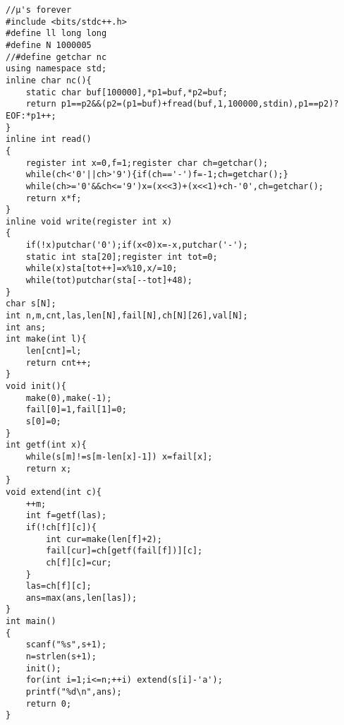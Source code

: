 \begin{verbatim}
//μ's forever
#include <bits/stdc++.h>
#define ll long long 
#define N 1000005
//#define getchar nc
using namespace std;
inline char nc(){
    static char buf[100000],*p1=buf,*p2=buf;
    return p1==p2&&(p2=(p1=buf)+fread(buf,1,100000,stdin),p1==p2)?EOF:*p1++;
}
inline int read()
{
    register int x=0,f=1;register char ch=getchar();
    while(ch<'0'||ch>'9'){if(ch=='-')f=-1;ch=getchar();}
    while(ch>='0'&&ch<='9')x=(x<<3)+(x<<1)+ch-'0',ch=getchar();
    return x*f;
}
inline void write(register int x)
{
    if(!x)putchar('0');if(x<0)x=-x,putchar('-');
    static int sta[20];register int tot=0;
    while(x)sta[tot++]=x%10,x/=10;
    while(tot)putchar(sta[--tot]+48);
}
char s[N];
int n,m,cnt,las,len[N],fail[N],ch[N][26],val[N];
int ans;
int make(int l){
    len[cnt]=l;
    return cnt++;
}
void init(){
    make(0),make(-1);
    fail[0]=1,fail[1]=0;
    s[0]=0;
}
int getf(int x){
    while(s[m]!=s[m-len[x]-1]) x=fail[x];
    return x;
}
void extend(int c){
    ++m;
    int f=getf(las);
    if(!ch[f][c]){
        int cur=make(len[f]+2);
        fail[cur]=ch[getf(fail[f])][c];
        ch[f][c]=cur;
    }
    las=ch[f][c];
    ans=max(ans,len[las]);
}
int main()
{
    scanf("%s",s+1);
    n=strlen(s+1);
    init();
    for(int i=1;i<=n;++i) extend(s[i]-'a');
    printf("%d\n",ans);
    return 0;
}
\end{verbatim}

